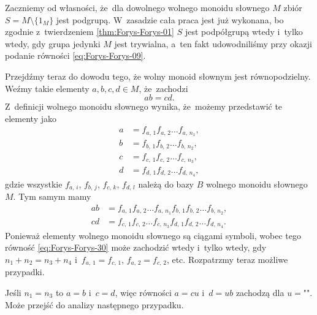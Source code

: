 \documentclass[a4paper,11pt]{article}
\begin{document}
Zaczniemy od własności, że~dla dowolnego wolnego monoidu słownego $M$
zbiór $S = M \setminus \{ 1_{ M } \}$ jest podgrupą. W~zasadzie cała praca jest już
wykonana, bo zgodnie z~twierdzeniem \ref{thm:Forys-Forys-01} $S$ jest
podpółgrupą wtedy i~tylko wtedy, gdy grupa jedynki $M$ jest trywialna,
a~ten fakt udowodniliśmy przy okazji podanie równości
\eqref{eq:Forys-Forys-09}.

Przejdźmy teraz do dowodu tego, że wolny monoid słownym jest
równopodzielny. Weźmy takie elementy $a, b, c, d \in M$, że~zachodzi
\begin{equation}
  \label{eq:Forys-Forys-30}
  a b = c d.
\end{equation}
Z~definicji wolnego monoidu słownego wynika, że~możemy przedstawić te
elementy jako
\begin{subequations}
  \begin{align}
    \label{eq:Forys-Forys-31-A}
    a &= f_{ a,\, 1 } f_{ a,\, 2 } \ldots f_{ a,\, n_{ 1 } }, \\
    \label{eq:Forys-Forys-31-B}
    b &= f_{ b,\, 1 } f_{ b,\, 2 } \ldots f_{ b,\, n_{ 2 } }, \\
    \label{eq:Forys-Forys-31-C}
    c &= f_{ c,\, 1 } f_{ c,\, 2 } \ldots f_{ c,\, n_{ 3 } }, \\
    \label{eq:Forys-Forys-31-D}
    d &= f_{ d,\, 1 } f_{ d,\, 2 } \ldots f_{ d,\, n_{ 4 } },
  \end{align}
\end{subequations}
gdzie wszystkie $f_{ a,\, i }$, $f_{ b,\, j }$, $f_{ c,\, k }$, $f_{ d,\, l }$
należą do bazy $B$ wolnego monoidu słownego~$M$. Tym samym mamy
\begin{subequations}
  \begin{align}
    \label{eq:Forys-Forys-32-A}
    a b
    &=
      f_{ a,\, 1 } f_{ a,\, 2 } \ldots f_{ a,\, n_{ 1 } } f_{ b,\, 1 }
      f_{ b,\, 2 } \ldots f_{ b,\, n_{ 2 } }, \\
    \label{eq:Forys-Forys-32-B}
    cd
    &=
      f_{ c,\, 1 } f_{ c,\, 2 } \ldots f_{ c,\, n_{ 3 } } f_{ d,\, 1 }
      f_{ d,\, 2 } \ldots f_{ d,\, n_{ 4 } }.
  \end{align}
\end{subequations}
Ponieważ elementy wolnego monoidu słownego są ciągami symboli, wobec tego
równość \eqref{eq:Forys-Forys-30} może zachodzić wtedy i~tylko
wtedy, gdy $n_{ 1 } + n_{ 2 } = n_{ 3 } + n_{ 4 }$ i~$f_{ a,\, 1 } = f_{ c,\, 1 }$,
$f_{ a,\, 2 } = f_{ c,\, 2 }$, etc. Rozpatrzmy teraz możliwe przypadki.

Jeśli $n_{ 1 } = n_{ 3 }$ to $a = b$ i~$c = d$, więc równości $a = cu$
i~$d = ub$ zachodzą dla $u = \texttt{""}$. Może przejść do analizy
następnego przypadku.
\end{document}

